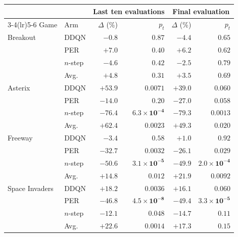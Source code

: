 \begin{tabular}{llrrrr}
\toprule
 & & \multicolumn{2}{c}{Last ten evaluations} & \multicolumn{2}{c}{Final evaluation} \\
\cmidrule(lr){3-4}\cmidrule(lr){5-6}
Game & Arm & $\Delta$ (\%) & $p_t$ & $\Delta$ (\%) & $p_t$ \\
\midrule
Breakout & DDQN & $-0.8$ & $0.87$ & $-4.4$ & $0.65$ \\
 & PER & $+7.0$ & $0.40$ & $+6.2$ & $0.62$ \\
 & $n$-step & $-4.6$ & $0.42$ & $-2.5$ & $0.79$ \\
 & Avg. & $+4.8$ & $0.31$ & $+3.5$ & $0.69$ \\
\midrule
Asterix & DDQN & $+53.9$ & $0.0071$ & $+39.0$ & $0.060$ \\
 & PER & $-14.0$ & $0.20$ & $-27.0$ & $0.058$ \\
 & $n$-step & $-76.4$ & $\mathbf{6.3\times10^{-4}}$ & $-79.3$ & $\mathbf{0.0013}$ \\
 & Avg. & $+62.4$ & $\mathbf{0.0023}$ & $+49.3$ & $0.020$ \\
\midrule
Freeway & DDQN & $-3.4$ & $0.58$ & $+1.0$ & $0.92$ \\
 & PER & $-32.7$ & $0.0032$ & $-26.1$ & $0.029$ \\
 & $n$-step & $-50.6$ & $\mathbf{3.1\times10^{-5}}$ & $-49.9$ & $\mathbf{2.0\times10^{-4}}$ \\
 & Avg. & $+14.8$ & $0.012$ & $+21.9$ & $0.0092$ \\
\midrule
Space Invaders & DDQN & $+18.2$ & $0.0036$ & $+16.1$ & $0.060$ \\
 & PER & $-46.8$ & $\mathbf{4.5\times10^{-8}}$ & $-49.4$ & $\mathbf{3.3\times10^{-5}}$ \\
 & $n$-step & $-12.1$ & $0.048$ & $-14.7$ & $0.11$ \\
 & Avg. & $+22.6$ & $\mathbf{0.0014}$ & $+17.3$ & $0.15$ \\
\bottomrule
\end{tabular}
